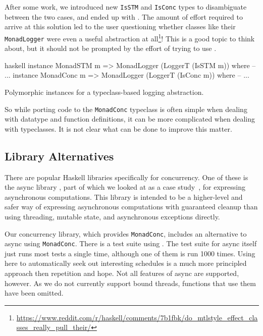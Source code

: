 After some work, we introduced new \verb|IsSTM| and \verb|IsConc|
types to disambiguate between the two cases, and ended up with
.  The amount of effort required to arrive at this
solution led to the user questioning whether classes like their
\verb|MonadLogger| were even a useful abstraction at
all\footnote{\url{https://www.reddit.com/r/haskell/comments/7b1fbk/do_mtlstyle_effect_classes_really_pull_their/}}!
This is a good topic to think about, but it should not be prompted by
the effort of trying to use \dejafu{}.

\begin{listing}
\centering
\begin{cminted}{haskell}
instance MonadSTM  m => MonadLogger (LoggerT (IsSTM  m)) where -- ...
instance MonadConc m => MonadLogger (LoggerT (IsConc m)) where -- ...
\end{cminted}
\caption{Polymorphic instances for a typeclass-based logging abstraction.}\label{lst:mlogger3}
\end{listing}

So while porting code to the \verb|MonadConc| typeclass is often
simple when dealing with datatype and function definitions, it can be
more complicated when dealing with typeclasses.  It is not clear what
can be done to improve this matter.

\subsection{Library Alternatives}

There are popular Haskell libraries specifically for concurrency.  One
of these is the async library \parencite{async}, part of which we looked at
as a case study~, for expressing
asynchronous computations.  This library is intended to be a
higher-level and safer way of expressing asynchronous computations
with guaranteed cleanup than using threading, mutable state, and
asynchronous exceptions directly.

Our concurrency library, which provides \verb|MonadConc|, includes an
alternative to async using \verb|MonadConc|.  There is a test suite
using \dejafu{}.  The test suite for async itself just runs most tests
a single time, although one of them is run 1000 times.  Using
\dejafu{} here to automatically seek out interesting schedules is a
much more principled approach then repetition and hope.  Not all
features of async are supported, however.  As we do not currently
support bound threads, functions that use them have been omitted.

